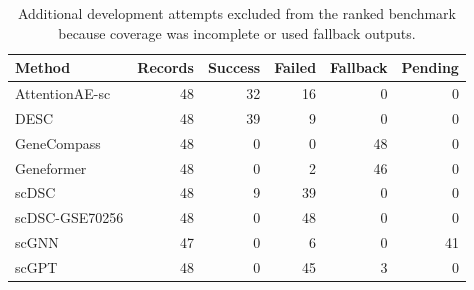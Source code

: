 \begin{table}[p]
\centering
\small
\caption{Additional development attempts excluded from the ranked benchmark because coverage was incomplete or used fallback outputs.}
\label{tab:development-incomplete}
\begin{tabular}{lrrrrr}
\toprule
Method & Records & Success & Failed & Fallback & Pending \\
\midrule
AttentionAE-sc & 48 & 32 & 16 & 0 & 0 \\
DESC & 48 & 39 & 9 & 0 & 0 \\
GeneCompass & 48 & 0 & 0 & 48 & 0 \\
Geneformer & 48 & 0 & 2 & 46 & 0 \\
scDSC & 48 & 9 & 39 & 0 & 0 \\
scDSC-GSE70256 & 48 & 0 & 48 & 0 & 0 \\
scGNN & 47 & 0 & 6 & 0 & 41 \\
scGPT & 48 & 0 & 45 & 3 & 0 \\
\bottomrule
\end{tabular}
\end{table}

